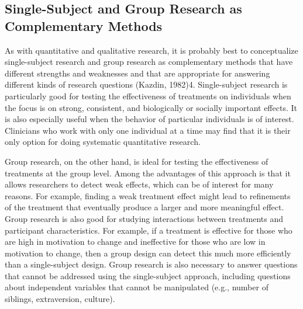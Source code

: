 \subsection{Single-Subject and Group Research as Complementary Methods}


As with quantitative and qualitative research, it is probably best to conceptualize single-subject research and group research as complementary methods that have different strengths and weaknesses and that are appropriate for answering different kinds of research questions (Kazdin, 1982)4. Single-subject research is particularly good for testing the effectiveness of treatments on individuals when the focus is on strong, consistent, and biologically or socially important effects. It is also especially useful when the behavior of particular individuals is of interest. Clinicians who work with only one individual at a time may find that it is their only option for doing systematic quantitative research.


Group research, on the other hand, is ideal for testing the effectiveness of treatments at the group level. Among the advantages of this approach is that it allows researchers to detect weak effects, which can be of interest for many reasons. For example, finding a weak treatment effect might lead to refinements of the treatment that eventually produce a larger and more meaningful effect. Group research is also good for studying interactions between treatments and participant characteristics. For example, if a treatment is effective for those who are high in motivation to change and ineffective for those who are low in motivation to change, then a group design can detect this much more efficiently than a single-subject design. Group research is also necessary to answer questions that cannot be addressed using the single-subject approach, including questions about independent variables that cannot be manipulated (e.g., number of siblings, extraversion, culture).


